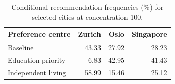 \begin{table}[!ht]\centering
\caption{Conditional recommendation frequencies (\%) for selected cities at concentration 100.}
\begin{tabular}{lrrr}\toprule
Preference centre & Zurich & Oslo & Singapore\\\midrule
Baseline & 43.33 & 27.92 & 28.23 \\
Education priority & 6.83 & 42.95 & 41.43 \\
Independent living & 58.99 & 15.46 & 25.12 \\
\bottomrule\end{tabular}\end{table}
